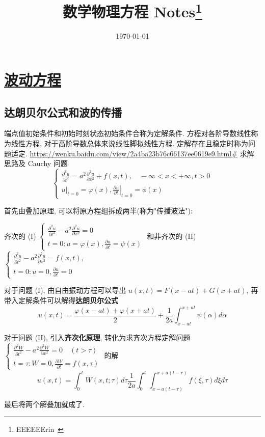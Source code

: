 \documentclass[10pt]{yerbaformat}
\title{数学物理方程 Notes\footnote{EEEEEErin~}}
\date{\today}
\begin{document}
\author{}
\maketitle
\tableofcontents
\footnotesize

\section{\href{https://wenku.baidu.com/view/cf58eb62ed630b1c58eeb506.html}{波动方程}}

\subsection{达朗贝尔公式和波的传播}

\par 端点值初始条件和初始时刻状态初始条件合称为定解条件. 方程对各阶导数线性称为线性方程, 对于高阶导数总体来说线性脚拟线性方程. 定解存在且稳定时称为问题适定.
\url{https://wenku.baidu.com/view/2a4ba23b76c66137ee0619e9.html#} 求解思路及 Cauchy 问题
$$
    \left\{\begin{array}{l}
        \frac{\partial^{2} u}{\partial t^{2}}=a^{2} \frac{\partial^{2} u}{\partial x^{2}} + f(x, t), \quad-\infty<x<+\infty, t>0 \\
        \left.u\right|_{t=0}=\varphi(x),\left.\frac{\partial u}{\partial t}\right|_{t=0}=\phi(x)
    \end{array}\right.
$$
\par 首先由叠加原理, 可以将原方程组拆成两半(称为"传播波法"):

齐次的 (I) $\left\{\begin{array}{l}\frac{\partial^{2} u}{\partial t^{2}}-a^{2} \frac{\partial^{2} u}{\partial x^{2}}=0 \\ t=0: u=\varphi(x), \frac{\partial u}{\partial t}=\psi(x)\end{array}\right.$
和非齐次的 (II) $\left\{\begin{array}{l}\frac{\partial^{2} u}{\partial t^{2}}-a^{2} \frac{\partial^{2} u}{\partial x^{2}}=f(x, t), \\ t=0: u=0, \frac{\partial u}{\partial t}=0\end{array}\right.$

\par 对于问题 (I), 由自由振动方程可以导出 $u(x, t)=F(x-a t)+G(x+a t)$, 再带入定解条件可以解得\textbf{达朗贝尔公式}
$$
    u(x, t)=\frac{\varphi(x-a t)+\varphi(x+a t)}{2}+\frac{1}{2 a} \int_{x-a t}^{x+a t} \psi(\alpha) d \alpha
$$

\par 对于问题 (II), 引入\textbf{齐次化原理}, 转化为求齐次方程定解问题 $\left\{\begin{array}{l}\frac{\partial^{2} W}{\partial t^{2}}-a^{2} \frac{\partial^{2} W}{\partial x^{2}}=0 \quad(t>\tau) \\ t=\tau: W=0, \frac{\partial W}{\partial t}=f(x, \tau)\end{array}\right.$ 的解 $$u(x, t)=\int_{0}^{t} W(x, t ; \tau) d \tau \frac{1}{2 a} \int_{0}^{t} \int_{x-a(t-\tau)}^{x+a(t-r)} f(\xi, \tau) d \xi d \tau $$
\par 最后将两个解叠加就成了.
\end{document}
